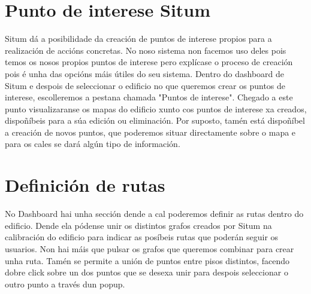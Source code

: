 \section{Punto de interese Situm}
Situm dá a posibilidade da creación de puntos de interese propios para a realización de accións concretas. No noso sistema non facemos uso deles pois temos os nosos propios puntos de interese pero explícase o proceso de creación pois é unha das opcións máis útiles do seu sistema.
Dentro do dashboard de Situm e despois de seleccionar o edificio no que queremos crear os puntos de interese, escolleremos a pestana chamada "Puntos de interese". Chegado a este punto visualizaranse os mapas do edificio xunto cos puntos de interese xa creados, dispoñíbeis para a súa edición ou eliminación. Por suposto, tamén está dispoñíbel a creación de novos puntos, que poderemos situar directamente sobre o mapa e para os cales se dará algún tipo de información.

\section{Definición de rutas}
No Dashboard hai unha sección dende a cal poderemos definir as rutas dentro do edificio. Dende ela pódense unir os distintos grafos creados por Situm na calibración do edificio para indicar as posíbeis rutas que poderán seguir os usuarios. Non hai máis que pulsar os grafos que queremos combinar para crear unha ruta. Tamén se permite a unión de puntos entre pisos distintos, facendo dobre click sobre un dos puntos que se desexa unir para despois seleccionar o outro punto a través dun popup.